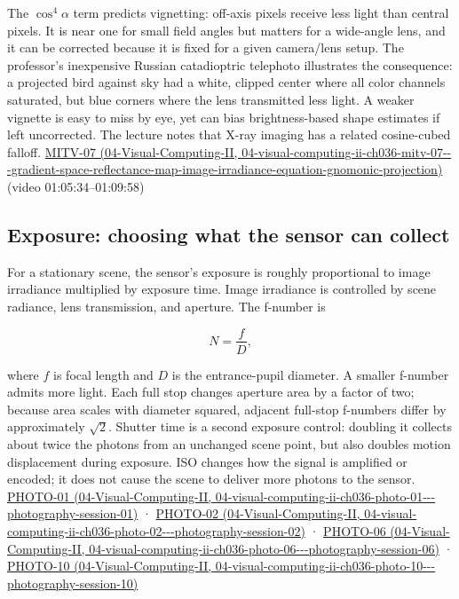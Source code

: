 The \(\cos^4\alpha\) term predicts vignetting: off-axis pixels receive less light than central pixels. It is near one for small field angles but matters for a wide-angle lens, and it can be corrected because it is fixed for a given camera/lens setup. The professor's inexpensive Russian catadioptric telephoto illustrates the consequence: a projected bird against sky had a white, clipped center where all color channels saturated, but blue corners where the lens transmitted less light. A weaker vignette is easy to miss by eye, yet can bias brightness-based shape estimates if left uncorrected. The lecture notes that X-ray imaging has a related cosine-cubed falloff. \href{../04-Visual-Computing-II/main.pdf\#nameddest=04-visual-computing-ii-ch036-mitv-07---gradient-space-reflectance-map-image-irradiance-equation-gnomonic-projection}{MITV-07 (04-Visual-Computing-II, 04-visual-computing-ii-ch036-mitv-07-\/-\/-gradient-space-reflectance-map-image-irradiance-equation-gnomonic-projection)} (video 01:05:34--01:09:58)

\subsection{Exposure: choosing what the sensor can collect}\label{03-visual-computing-i-ch003-exposure-choosing-what-the-sensor-can-collect}

For a stationary scene, the sensor's exposure is roughly proportional to image irradiance multiplied by exposure time. Image irradiance is controlled by scene radiance, lens transmission, and aperture. The f-number is

\[
N=\frac{f}{D},
\]

where \(f\) is focal length and \(D\) is the entrance-pupil diameter. A smaller f-number admits more light. Each full stop changes aperture area by a factor of two; because area scales with diameter squared, adjacent full-stop f-numbers differ by approximately \(\sqrt 2\). Shutter time is a second exposure control: doubling it collects about twice the photons from an unchanged scene point, but also doubles motion displacement during exposure. ISO changes how the signal is amplified or encoded; it does not cause the scene to deliver more photons to the sensor. \href{../04-Visual-Computing-II/main.pdf\#nameddest=04-visual-computing-ii-ch036-photo-01---photography-session-01}{PHOTO-01 (04-Visual-Computing-II, 04-visual-computing-ii-ch036-photo-01-\/-\/-photography-session-01)} · \href{../04-Visual-Computing-II/main.pdf\#nameddest=04-visual-computing-ii-ch036-photo-02---photography-session-02}{PHOTO-02 (04-Visual-Computing-II, 04-visual-computing-ii-ch036-photo-02-\/-\/-photography-session-02)} · \href{../04-Visual-Computing-II/main.pdf\#nameddest=04-visual-computing-ii-ch036-photo-06---photography-session-06}{PHOTO-06 (04-Visual-Computing-II, 04-visual-computing-ii-ch036-photo-06-\/-\/-photography-session-06)} · \href{../04-Visual-Computing-II/main.pdf\#nameddest=04-visual-computing-ii-ch036-photo-10---photography-session-10}{PHOTO-10 (04-Visual-Computing-II, 04-visual-computing-ii-ch036-photo-10-\/-\/-photography-session-10)}

